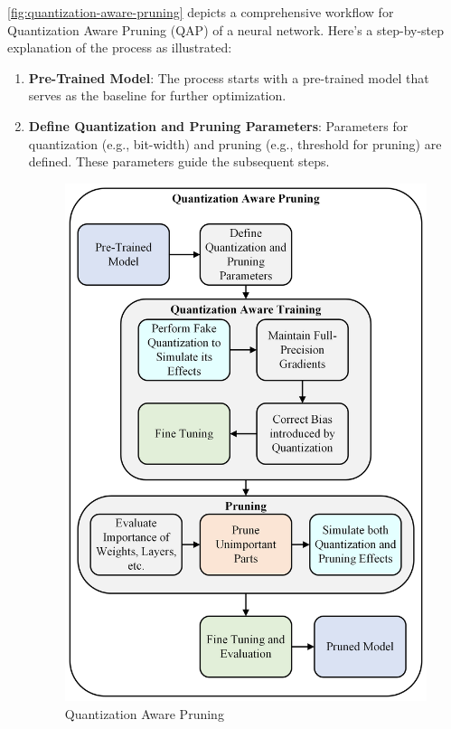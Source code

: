 \documentclass{ioereport}
\begin{document}
    \autoref{fig:quantization-aware-pruning} depicts a comprehensive workflow for Quantization Aware Pruning (QAP) of a neural network. Here's a step-by-step explanation of the process as illustrated:    
    \begin{enumerate}[label=\textbf{\roman*.}]
        \item \textbf{Pre-Trained Model}: The process starts with a pre-trained model that serves as the baseline for further optimization.
        
        \item \textbf{Define Quantization and Pruning Parameters}: Parameters for quantization (e.g., bit-width) and pruning (e.g., threshold for pruning) are defined. These parameters guide the subsequent steps.
        
    \begin{figure}[H]
        \centering
        \includegraphics[width=0.9\linewidth]{assets/Quantization Aware Pruning.png}
        \caption{Quantization Aware Pruning}
        \label{fig:quantization-aware-pruning}
    \end{figure}


\end{enumerate}
\end{document}
